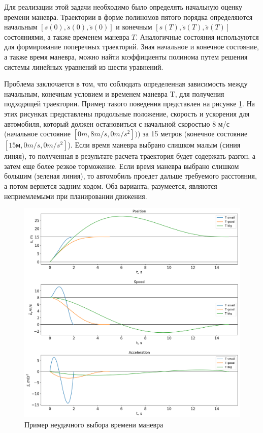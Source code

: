 Для реализации этой задачи необходимо было определять начальную оценку времени маневра. Траектории в форме
полиномов пятого порядка определяются начальным $[s(0), \dot{s}(0), \ddot{s}(0)]$ и конечным
$[s(T), \dot{s}(T), \ddot{s}(T)]$ состояниями, а также временем маневра $T$. Аналогичные состояния
используются для формирование поперечных траекторий. Зная начальное и конечное состояние, а также время
маневра, можно найти коэффициенты полинома путем решения системы линейных уравнений из шести уравнений.

Проблема заключается в том, что соблюдать определенная зависимость между начальным, конечным условием и
временем маневра T, для получения подходящей траектории. Пример такого поведения представлен на рисунке
\ref{img:quintic_bad_t}. На этих рисунках представлены продольные положение, скорость и ускорения для автомобиля,
который должен остановиться с начальной скоростью 8 м/с (начальное состояние $[0 m, 8 m/s, 0 m/s^2])$) за
15 метров (конечное состояние $[15 м, 0 m/s, 0 m/s^2]$). Если время маневра выбрано слишком малым
(синия линяя), то полученная в результате расчета траектория будет содержать разгон, а затем еще более резкое торможение. Если время маневра выбрано слишком большим (зеленая линия), то автомобиль проедет дальше
требуемого расстояния, а потом вернется задним ходом. Оба варианта, разумеется, являются неприемлемыми
при планировании движения.

\begin{figure}[h]
    \centering
    \includegraphics[width=1\textwidth]{images/quintic_bad_t}
    \caption{Пример неудачного выбора времени маневра}
    \label{img:quintic_bad_t}
\end{figure}

